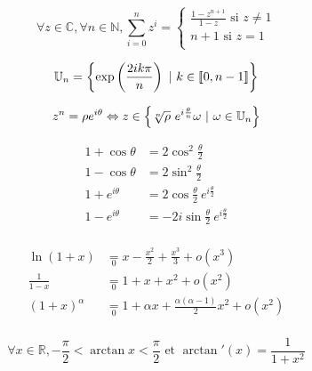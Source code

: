 
\begin{lemme}\[
    \forall z \in \mathbb{C}, \forall n \in \mathbb{N}, \sum_{i=0}^{n} z^i = \left\{\begin{array}{l} \frac{1-z^{n+1}}{1-z} \text{ si } z \neq 1 \\
                                                                                                    n+1 \text{ si } z = 1 \\
                                                                                    \end{array}\right.
\]\end{lemme}

\begin{lemme}\[
    \mathbb{U}_n = \left\{\exp\left(\frac{2ik\pi}{n}\right)\ |\ k\in\seg{0}{n-1}\right\}
\]\end{lemme}

\begin{lemme}\[
    z^n = \rho e^{i\theta} \equival z \in \left\{ \sqrt[n]{\rho}\ e^{i\frac{\theta}{n}}\omega\ |\ \omega\in\mathbb{U}_n\right\}
\]\end{lemme}

\begin{lemme}\[
    \begin{split}
        1+\cos\theta  &= 2\cos^2\frac{\theta}{2} \\
        1-\cos\theta  &= 2\sin^2\frac{\theta}{2} \\
        1+e^{i\theta} &= 2\cos\frac{\theta}{2}\ e^{i\frac{\theta}{2}} \\
        1-e^{i\theta} &= -2i\sin\frac{\theta}{2}\ e^{i\frac{\theta}{2}} \\
    \end{split}
\]\end{lemme}

\begin{lemme}\[
    \begin{split}
        \ln(1+x) &\underset{0}{=} x - \frac{x^2}{2} + \frac{x^3}{3} + o(x^3) \\
        \frac{1}{1-x} &\underset{0}{=} 1 + x + x^2 + o(x^2) \\
        (1+x)^\alpha &\underset{0}{=} 1 + \alpha x + \frac{\alpha(\alpha - 1)}{2}x^2 + o(x^2) \\
    \end{split}
\]\end{lemme}

\begin{lemme}\[
    \forall x \in \mathbb{R}, -\frac{\pi}{2} < \arctan x < \frac{\pi}{2} \text{ et } \arctan'(x) = \frac{1}{1+x^2}
\]\end{lemme}

